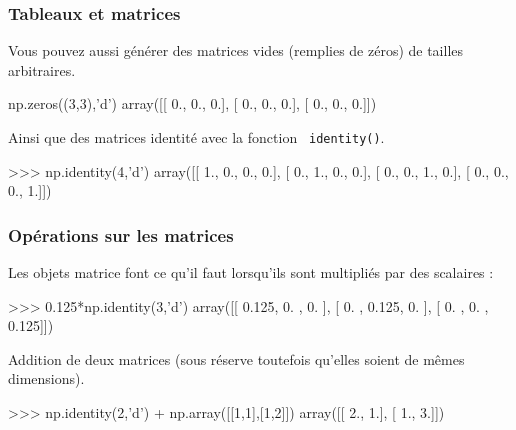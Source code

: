 \begin{frame}[fragile]
\frametitle{Tableaux et matrices}

Vous pouvez aussi générer des matrices vides (remplies de zéros) de tailles arbitraires.

\begin{GrayBox}[0.85\textwidth]
\begin{verbatimtab}[3]
np.zeros((3,3),'d')
array([[ 0.,  0.,  0.],
       [ 0.,  0.,  0.],
       [ 0.,  0.,  0.]])
\end{verbatimtab}
\end{GrayBox}

Ainsi que des matrices identité avec la fonction \verb? identity()?.

\begin{GrayBox}[0.85\textwidth]
\begin{verbatimtab}[3]
>>> np.identity(4,'d')
array([[ 1.,  0.,  0.,  0.],
       [ 0.,  1.,  0.,  0.],
       [ 0.,  0.,  1.,  0.],
       [ 0.,  0.,  0.,  1.]])
\end{verbatimtab}
\end{GrayBox}
\end{frame}

\begin{frame}[fragile]
\frametitle{Opérations sur les matrices}

Les objets matrice font ce qu'il faut lorsqu'ils sont multipliés par des scalaires :

\begin{GrayBox}[0.85\textwidth]
\begin{verbatimtab}[3]
>>> 0.125*np.identity(3,'d')
array([[ 0.125,  0.   ,  0.   ],
       [ 0.   ,  0.125,  0.   ],
       [ 0.   ,  0.   ,  0.125]])
\end{verbatimtab}
\end{GrayBox}

Addition de deux matrices (sous réserve toutefois qu'elles soient de mêmes dimensions).

\begin{GrayBox}[0.85\textwidth]
\begin{verbatimtab}[3]
>>> np.identity(2,'d') + np.array([[1,1],[1,2]])
array([[ 2.,  1.],
       [ 1.,  3.]])
\end{verbatimtab}
\end{GrayBox}

\end{frame}

